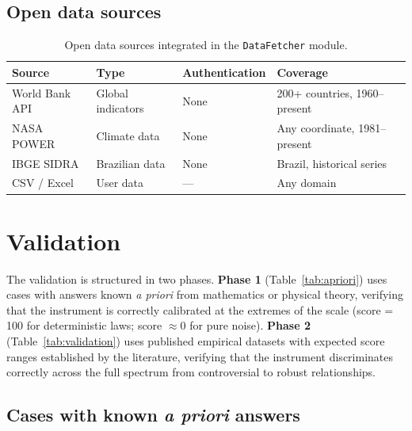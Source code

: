 \documentclass[12pt,a4paper]{article}
\begin{document}
\subsection{Open data sources}

\begin{table}[h!]
\centering
\small
\begin{tabular}{llll}
\toprule
\textbf{Source} & \textbf{Type} & \textbf{Authentication} & \textbf{Coverage} \\
\midrule
World Bank API  & Global indicators & None & 200+ countries, 1960--present \\
NASA POWER      & Climate data      & None & Any coordinate, 1981--present \\
IBGE SIDRA      & Brazilian data    & None & Brazil, historical series \\
CSV / Excel     & User data         & ---  & Any domain \\
\bottomrule
\end{tabular}
\caption{Open data sources integrated in the \texttt{DataFetcher} module.}
\label{tab:datasources}
\end{table}

\section{Validation}
\label{sec:validation}

The validation is structured in two phases. \textbf{Phase 1} (Table~\ref{tab:apriori}) uses cases with answers
known \textit{a priori} from mathematics or physical theory, verifying that the
instrument is correctly calibrated at the extremes of the scale (score = 100
for deterministic laws; score $\approx 0$ for pure noise). \textbf{Phase 2} (Table~\ref{tab:validation}) uses published
empirical datasets with expected score ranges established by the literature,
verifying that the instrument discriminates correctly across the full spectrum
from controversial to robust relationships.

\subsection{Cases with known \textit{a priori} answers}
\end{document}
